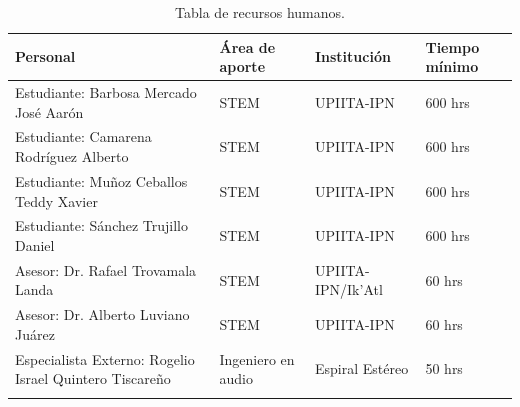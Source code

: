 \begin{center}
\footnotesize
    \begin{longtable}[!htb]{| m{15em} | m{6em} | m{6em}| m{6em}|}
    \hline
    \textbf{Personal}& \textbf{\'Area de aporte} & \textbf{Instituci\'on} & \textbf{Tiempo m\'inimo}\\
    \hline\hline
    Estudiante: Barbosa Mercado José Aarón & STEM & UPIITA-IPN & 600 hrs\\
    \hline
    Estudiante: Camarena Rodríguez Alberto & STEM & UPIITA-IPN & 600 hrs\\
    \hline
    Estudiante: Muñoz Ceballos Teddy Xavier & STEM & UPIITA-IPN & 600 hrs\\
    \hline
    Estudiante: Sánchez Trujillo Daniel & STEM & UPIITA-IPN & 600 hrs\\
    \hline
    Asesor: Dr. Rafael Trovamala Landa & STEM & UPIITA-IPN/Ik'Atl & 60 hrs\\
    \hline
    Asesor: Dr. Alberto Luviano Juárez & STEM & UPIITA-IPN & 60 hrs\\
    \hline
    Especialista Externo: Rogelio Israel Quintero Tiscareño & Ingeniero en audio & Espiral Est\'ereo & 50 hrs\\
    \hline

    \caption{Tabla de recursos humanos.}
    \label{tab:RH}
    \end{longtable}
\end{center}

